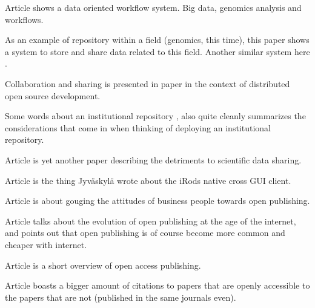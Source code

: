 Article \cite{DBLP:conf/bcb/PiredduLSZ14} shows a data oriented workflow
system. Big data, genomics analysis and workflows.

As an example of repository within a field (genomics, this time), this paper
\cite{craigon2004nascarrays} shows a system to store and share data related
to this field. Another similar system here \cite{DBLP:journals/nar/EdgarDL03}.

Collaboration and sharing is presented in paper \cite{craigon2004nascarrays} in
the context of distributed open source development.

Some words about an institutional repository \cite{gibbons2009benefits}, also
quite cleanly summarizes the considerations that come in when thinking of
deploying an institutional repository.

Article \cite{DBLP:conf/icegov/SayogoP11} is yet another paper describing
the detriments to scientific data sharing.

Article \cite{irodsinproceedings} is the thing Jyväskylä wrote about the iRods
native cross GUI client.

Article \cite{DBLP:conf/elpub/Hedlund08} is about gouging the attitudes of
business people towards open publishing.

Article \cite{laakso2011development} talks about the evolution of open
publishing at the age of the internet, and points out that open publishing
is of course become more common and cheaper with internet.

Article \cite{suber2007open} is a short overview of open access publishing.

Article \cite{harnad2004comparing} boasts a bigger amount of citations to
papers that are openly accessible to the papers that are not (published in the
same journals even).
